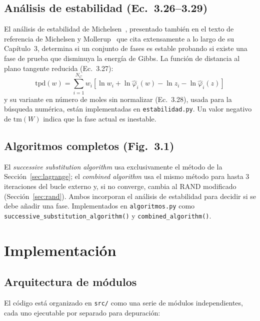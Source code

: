 \documentclass[11pt,a4paper]{article}
\begin{document}
\subsection{Análisis de estabilidad (Ec.~3.26--3.29)}

El análisis de estabilidad de Michelsen~\citep{michelsen1982},
presentado también en el texto de referencia de
Michelsen y Mollerup~\citep{michelsenmollerup2007} que
\citet{tsanas2018} cita extensamente a lo largo de su Capítulo~3,
determina si un conjunto de fases es estable probando si existe una
fase de prueba que disminuya la energía de Gibbs. La función de
distancia al plano tangente reducida (Ec.~3.27):
\begin{equation}
  \mathrm{tpd}(w) = \sum_{i=1}^{N_C} w_i\left[\ln w_i + \ln\hat\varphi_i(w) - \ln z_i - \ln\hat\varphi_i(z)\right]
  \label{eq:3.27}
\end{equation}
y su variante en número de moles sin normalizar (Ec.~3.28), usada para
la búsqueda numérica, están implementadas en \texttt{estabilidad.py}.
Un valor negativo de $\mathrm{tm}(W)$ indica que la fase actual es
inestable.

\subsection{Algoritmos completos (Fig.~3.1)}

El \emph{successive substitution algorithm} usa exclusivamente el
método de la Sección~\ref{sec:lagrange}; el \emph{combined algorithm}
usa el mismo método para hasta 3 iteraciones del bucle externo y, si no
converge, cambia al RAND modificado (Sección~\ref{sec:rand}). Ambos
incorporan el análisis de estabilidad para decidir si se debe añadir
una fase. Implementados en \texttt{algoritmos.py} como
\texttt{successive\_substitution\_algorithm()} y
\texttt{combined\_algorithm()}.

\section{Implementación}
\label{sec:implementacion}

\subsection{Arquitectura de módulos}

El código está organizado en \texttt{src/} como una serie de módulos
independientes, cada uno ejecutable por separado para depuración:
\end{document}
